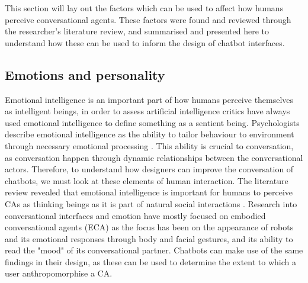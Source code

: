This section will lay out the factors which can be used to affect how humans perceive conversational agents. These factors were found and reviewed through the researcher's literature review, and summarised and presented here to understand how these can be used to inform the design of chatbot interfaces.

\subsection{Emotions and personality}
Emotional intelligence is an important part of how humans perceive themselves as intelligent beings, in order to assess artificial intelligence critics have always used emotional intelligence to define something as a sentient being. Psychologists describe emotional intelligence as the ability to tailor behaviour to environment through necessary emotional processing \citep{callejas2011}. This ability is crucial to conversation, as conversation happen through dynamic relationships between the conversational actors. Therefore, to understand how designers can improve the conversation of chatbots, we must look at these elements of human interaction. The literature review revealed that emotional intelligence is important for humans to perceive CAs as thinking beings as it is part of natural social interactions \citep{Griol2015a,Griol2017,Balzarotti2014,Lemon2012,Mencia2012,McTear2016a}. Research into conversational interfaces and emotion have mostly focused on embodied conversational agents (ECA) \citep{Lester1997,Stern2003, Beun2003,Reeves1996} as the focus has been on the appearance of robots and its emotional responses through body and facial gestures, and its ability to read the "mood" of its conversational partner. Chatbots can make use of the same findings in their design, as these can be used to determine the extent to which a user anthropomorphise a CA.

